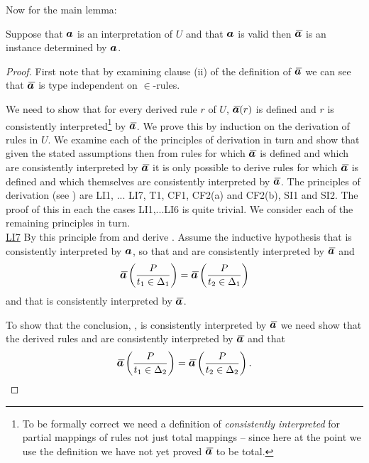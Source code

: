 Now for the main lemma:
\begin{lemma}
Suppose that $\iI$ is an interpretation of $U$  and that $\iI$ is valid  then $\Ibar$ is an instance determined by $\iI$.
\end{lemma}
\begin{proof} 
\newcommand {\forceSOURCEwidth}{\rule{5cm}{0pt}}  %
\newcommand {\forceTARGETwidth}{\rule{2.2cm}{0pt}}
First note that by examining clause (ii) of the definition of $\Ibar$ we can see that $\Ibar$ is  type independent 
on $\in$-rules. 

We need to show that for every derived rule $r$ of $U$, $\Ibar(r)$ is defined and $r$ is consistently interpreted\footnote{To be formally correct we need a definition of \textit{consistently interpreted} for partial mappings of rules not just total mappings -- since here at the point we use the definition we have not yet proved $\Ibar$ to be total.} by $\Ibar$. 
We prove this by induction on the derivation of rules in $U$. We examine each of the principles of derivation in turn
and show that given the stated assumptions then from rules for which $\Ibar$ is defined and which are consistently interpreted by $\Ibar$ 
it is only possible to derive rules for which $\Ibar$ is defined and which themselves are consistently interpreted by $\Ibar$.
The principles of derivation (see \cite{Cartmell86}) are LI1, ... LI7, T1, CF1, CF2(a) and CF2(b), SI1 and SI2. 
The proof of this  in each the cases  LI1,...LI6 is quite trivial. We consider each of the remaining principles in turn. 
 \\
\underline{LI7} 
By this principle from  and  derive
. 
Assume the inductive hypothesis that  is consistently interpreted by $\iI$,
so that
 and
 are consistently interpreted by $\Ibar$
and  
\begin{equation}
\label{LI7t1t2delta1}
\ibarmappedrule{P}{\ofT{t_1}{\Delta_1}}=\ibarmappedrule{P}{\ofT{t_2}{\Delta_1}}
\end{equation}
and that  is consistently interpreted by $\Ibar$.

To show that the conclusion, , is consistently interpreted by $\Ibar$ we need show that the derived rules 
 and
 are consistently interpreted by $\Ibar$
and that 
\begin{equation}
\label{LI7t1t2delta2}
\ibarmappedrule{P}{\ofT{t_1}{\Delta_2}}=\ibarmappedrule{P}{\ofT{t_2}{\Delta_2}}.
\end{equation}
 

\end{proof}
